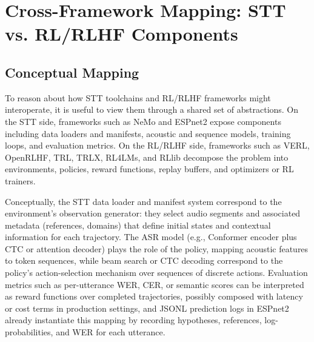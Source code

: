 \documentclass[conference]{IEEEtran}
\begin{document}
\section{Cross-Framework Mapping: STT vs. RL/RLHF Components}



\label{sec:cross-mapping}

\subsection{Conceptual Mapping}

To reason about how STT toolchains and RL/RLHF frameworks might interoperate, it is useful to view them through a shared set of abstractions.
On the STT side, frameworks such as NeMo and ESPnet2 expose components including data loaders and manifests, acoustic and sequence models, training loops, and evaluation metrics.
On the RL/RLHF side, frameworks such as VERL, OpenRLHF, TRL, TRLX, RL4LMs, and RLlib decompose the problem into environments, policies, reward functions, replay buffers, and optimizers or RL trainers.

Conceptually, the STT data loader and manifest system correspond to the environment’s observation generator: they select audio segments and associated metadata (references, domains) that define initial states and contextual information for each trajectory.
The ASR model (e.g., Conformer encoder plus CTC or attention decoder) plays the role of the policy, mapping acoustic features to token sequences, while beam search or CTC decoding correspond to the policy’s action-selection mechanism over sequences of discrete actions.
Evaluation metrics such as per-utterance WER, CER, or semantic scores can be interpreted as reward functions over completed trajectories, possibly composed with latency or cost terms in production settings, and JSONL prediction logs in ESPnet2 already instantiate this mapping by recording hypotheses, references, log-probabilities, and WER for each utterance.
\end{document}
